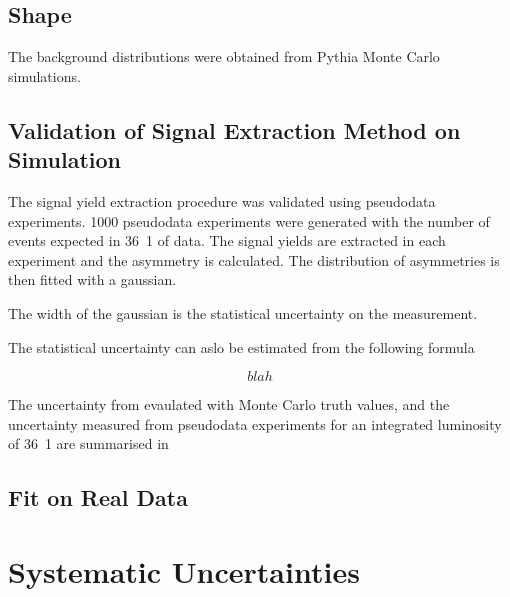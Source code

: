 \subsection{\EWK \ETm Shape}

The \EWK background \ETm distributions were obtained from Pythia Monte Carlo
simulations.


\subsection{Validation of Signal Extraction Method on Simulation}

The signal yield extraction procedure was validated using pseudodata
experiments. 1000 pseudodata experiments were generated with the number of
events expected in \unit{36.1}{\invpb} of data. The signal yields are extracted
in each experiment and the asymmetry is calculated. The distribution of
asymmetries is then fitted with a gaussian.

The width of the gaussian is the statistical uncertainty on the measurement.

The statistical uncertainty can aslo be estimated from the following formula

\begin{equation}
  blah
  \label{asym36:statuncert}
\end{equation}

The uncertainty from  evaulated with Monte Carlo truth
values, and the uncertainty measured from pseudodata experiments for an
integrated luminosity of \unit{36.1}{\invpb} are summarised in


\subsection{Fit on Real Data}

\section{Systematic Uncertainties}
